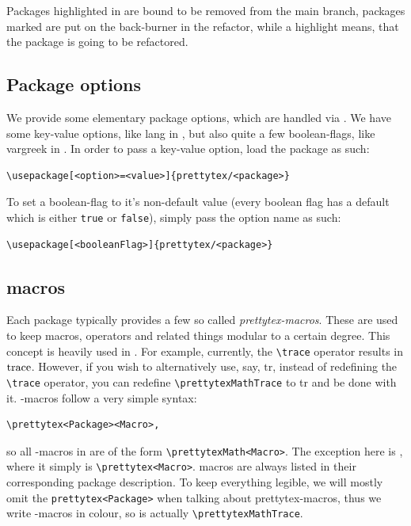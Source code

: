 Packages highlighted in  are bound to be removed from the main branch, packages marked  are put on the back-burner in the refactor, while a  highlight means, that the package is going to be refactored. 




\subsection{Package options}

We provide some elementary package options, which are handled via . We have some key-value options, like lang in , but also quite a few boolean-flags, like vargreek in . In order to pass a key-value option, load the package as such:

\begin{verbatim}
\usepackage[<option>=<value>]{prettytex/<package>}
\end{verbatim}

To set a boolean-flag to it's non-default value (every boolean flag has a default which is either \verb|true| or \verb|false|), simply pass the option name as such:

\begin{verbatim}
\usepackage[<booleanFlag>]{prettytex/<package>}
\end{verbatim}


\subsection{\prettytex{} macros}

Each package typically provides a few so called \emph{prettytex-macros}. These are used to keep macros, operators and related things modular to a certain degree. This concept is heavily used in \pmath{}. For example, currently, the \verb|\trace| operator results in $\trace$. However, if you wish to alternatively use, say, $\mathrm{tr}$, instead of redefining the \verb|\trace| operator, you can redefine \verb|\prettytexMathTrace| to tr and be done with it. \prettytex{}-macros follow a very simple syntax:

\begin{verbatim}
\prettytex<Package><Macro>,
\end{verbatim}

so all \prettytex{}-macros in \pmath{} are of the form \verb|\prettytexMath<Macro>|. The exception here is \pbase{}, where it simply is \verb|\prettytex<Macro>|. \prettytex{} macros are always listed in their corresponding package description. To keep everything legible, we will mostly omit the \verb|prettytex<Package>| when talking about prettytex-macros, thus we write \prettytex-macros in colour, so  is actually \verb|\prettytexMathTrace|.


